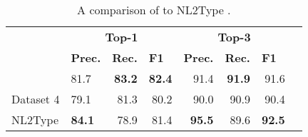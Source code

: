 
\begin{table}
\scriptsize
\centering
\begin{tabular}{llrrrrrr}
\toprule
\multirow{2}{*}{\textbf{}}              & \multicolumn{3}{c}{\textbf{Top-1}}                                & \multicolumn{3}{c}{\textbf{Top-3}}                                        \\ \cline{2-7} 
                                                & \textbf{Prec.} & \textbf{Rec.} & \multicolumn{1}{l|}{\textbf{F1}} & \textbf{Prec.} & \textbf{Rec.} & \multicolumn{1}{l}{\textbf{F1}} \\ \midrule
                                                
\dltpy{}                   & 81.7          & \textbf{83.2} & \textbf{82.4} &   91.4            & \textbf{91.9}   & 91.6          \\ 
\dltpy{} \tiny{Dataset 4}  & 79.1                            & 81.3                           & 80.2                               & 90.0                            & 90.9                           & 90.4          \\
NL2Type & \textbf{84.1}    & 78.9          & 81.4          &   \textbf{95.5}   & 89.6          & \textbf{92.5}                   \\ 
\bottomrule
\end{tabular}
\caption{A comparison of \dltpy{} to NL2Type \cite{Malik2019NL2Type:Information}.}
\label{table:results-compare}
\end{table}
